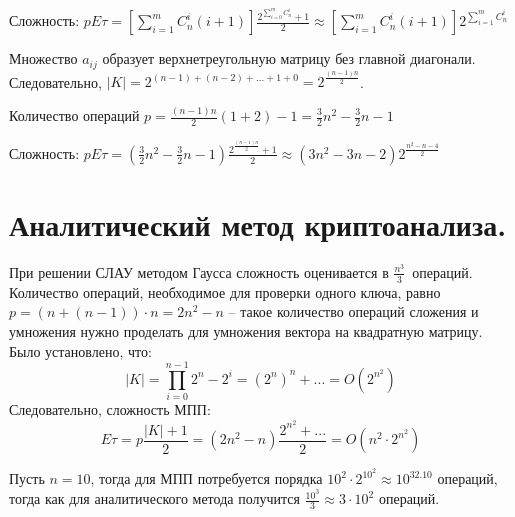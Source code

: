 \documentclass[letterpaper,11pt,openany]{book}
\begin{document}
\noindent Сложность: $pE\tau = [\sum _{i = 1} ^ m C_n ^ i (i + 1)] \frac{2 ^ { \sum _{i = 0} ^ m C_n ^ i} + 1}{2} \approx [\sum _{i = 1} ^ m C_n ^ i (i + 1)] 2 ^ { \sum _{i = 1} ^ m C_n ^ i}$


Множество $a_{ij}$ образует верхнетреугольную матрицу без главной диагонали. Следовательно, $|K| = 2 ^ {(n - 1) + (n - 2) + ... + 1 + 0} = 2 ^ { \frac{(n-1)n}{2} }$.

\noindent Количество операций $p = \frac{(n-1)n}{2}(1 + 2) - 1 = \frac{3}{2} n ^ 2 - \frac{3}{2} n - 1$

\noindent Сложность: $pE\tau = (\frac{3}{2} n ^ 2 - \frac{3}{2} n - 1) \frac{2 ^ { \frac{(n-1)n}{2} } + 1}{2} \approx (3 n ^ 2 - 3 n - 2) 2 ^ { \frac{n ^ 2 - n - 4}{2}}$

\section{Аналитический метод криптоанализа.}


При решении СЛАУ методом Гаусса сложность оценивается в $\frac{n^3}{3}$~операций. Количество операций, необходимое для проверки одного ключа, равно $p = (n + (n - 1)) \cdot n = 2 n ^ 2 - n$ -- такое количество операций сложения и умножения нужно проделать для умножения вектора на квадратную матрицу. Было установлено, что:
$$|K| = \prod_{i = 0} ^ {n - 1} 2^n - 2^i = (2 ^ n) ^ {n} + ... = O(2 ^ {n^2})$$
Следовательно, сложность МПП:
$$E\tau = p \frac{|K| + 1}{2} = (2 n ^ 2 - n) \frac{2 ^ {n^2} + ...}{2} = O (n^2 \cdot 2 ^ {n^2})$$

Пусть $n = 10$, тогда для МПП потребуется порядка $10^2 \cdot 2 ^ {10^2} \approx 10^{32.10}$ операций, тогда как для аналитического метода получится $\frac{10^3}{3} \approx 3 \cdot 10^2$ операций.
\end{document}
